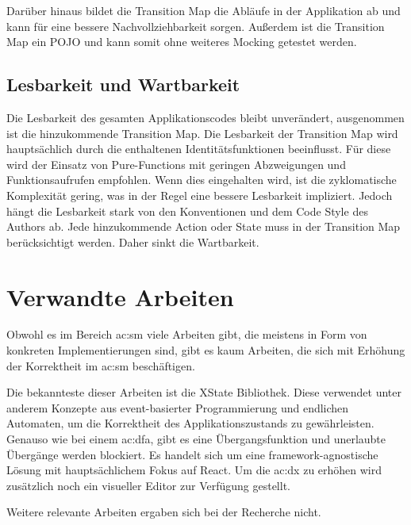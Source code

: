 Darüber hinaus bildet die Transition Map die Abläufe in der Applikation ab und kann für eine bessere Nachvollziehbarkeit sorgen. Außerdem ist die Transition Map ein POJO und kann somit ohne weiteres Mocking getestet werden.

\subsection{Lesbarkeit und Wartbarkeit}
Die Lesbarkeit des gesamten Applikationscodes bleibt unverändert, ausgenommen ist die hinzukommende Transition Map. Die Lesbarkeit der Transition Map wird hauptsächlich durch die enthaltenen Identitätsfunktionen beeinflusst. Für diese wird der Einsatz von Pure-Functions mit geringen Abzweigungen und Funktionsaufrufen empfohlen. Wenn dies eingehalten wird, ist die zyklomatische Komplexität gering, was in der Regel eine bessere Lesbarkeit impliziert. Jedoch hängt die Lesbarkeit stark von den Konventionen und dem Code Style des Authors ab. Jede hinzukommende Action oder State muss in der Transition Map berücksichtigt werden. Daher sinkt die Wartbarkeit.


\section{Verwandte Arbeiten}

Obwohl es im Bereich \acrlong{ac:sm} viele Arbeiten gibt, die meistens in Form von konkreten Implementierungen sind, gibt es kaum Arbeiten, die sich mit Erhöhung der Korrektheit im \acrshort{ac:sm} beschäftigen.

Die bekannteste dieser Arbeiten ist die XState Bibliothek. Diese verwendet unter anderem Konzepte aus event-basierter Programmierung und endlichen Automaten, um die Korrektheit des Applikationszustands zu gewährleisten. Genauso wie bei einem \acrshort{ac:dfa}, gibt es eine Übergangsfunktion und unerlaubte Übergänge werden blockiert. Es handelt sich um eine framework-agnostische Lösung mit hauptsächlichem Fokus auf React. Um die \acrlong{ac:dx} zu erhöhen wird zusätzlich noch ein visueller Editor zur Verfügung gestellt.\cite{xstate}

Weitere relevante Arbeiten ergaben sich bei der Recherche nicht.